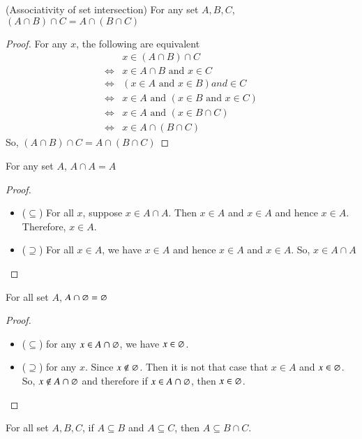 \begin{prop}
    (Associativity of set intersection) For any set $A,B,C$, $(A\cap B)\cap C = A\cap (B \cap C)$
\end{prop}
\begin{proof}
    For any $x$, the following are equivalent 
    \begin{align*}
        & x\in (A\cap B) \cap C\\
        \Leftrightarrow & x\in A\cap B \text{ and } x\in C\\
        \Leftrightarrow & (x\in A\text{ and } x\in B) and \in C\\
        \Leftrightarrow & x\in A \text{ and }(x\in B\text{ and  }x\in C)\\
        \Leftrightarrow & x\in A \text{ and }(x\in B\cap C)\\
        \Leftrightarrow & x\in A\cap(B\cap C)
    \end{align*}
    So, $(A\cap B)\cap C = A\cap(B\cap C)$
\end{proof}
\begin{prop}
    For any set $A$, $A\cap A = A$
\end{prop}
\begin{proof}
    ~
    \begin{itemize}
        \item ($\subseteq$) For all $x$, suppose $x\in A\cap A$. Then $x\in A$ and $x\in A$ and hence $x\in A$. Therefore, $x\in A$.
        \item ($\supseteq$) For all $x\in A$, we have $x\in A$ and hence $x\in A$ and $x\in A$. So, $x\in A\cap A$ 
    \end{itemize}
\end{proof}
\begin{prop}
    For all set $A$, $A\cap \varnothing = \varnothing$
\end{prop}
\begin{proof}
    ~
    \begin{itemize}
        \item ($\subseteq$) for any $x\in A\cap \varnothing$, we have $x\in \varnothing$.
        \item ($\supseteq$) for any $x$. Since $x\not\in \varnothing$. Then it is not that case that $x\in A$ and $x\in \varnothing$. So, $x\not\in A\cap \varnothing$ and therefore if $x\in A\cap \varnothing$, then $x\in \varnothing$.
    \end{itemize}
\end{proof}
\begin{prop}
    For all set $A,B,C$, if $A\subseteq B$ and $A\subseteq C$, then $A\subseteq B\cap C$.
\end{prop}
